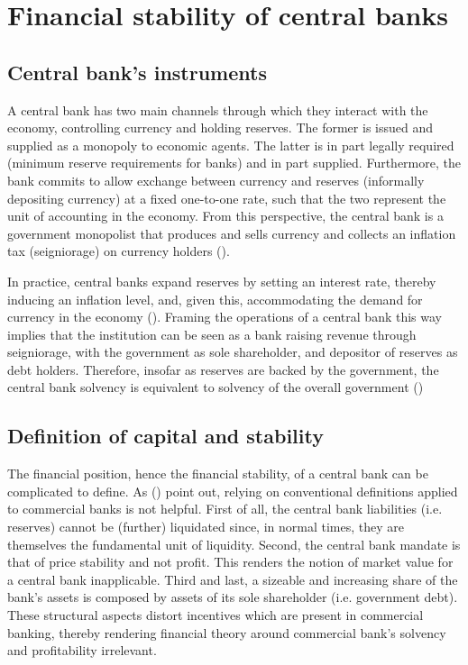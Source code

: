 \documentclass[american]{scrartcl}
\newcommand{\citein}[1]{\citeauthor{#1} (\citeyear{#1})}
\begin{document}
\section{Financial stability of central banks}

\subsection{Central bank's instruments}

A central bank has two main channels through which they interact with the economy, controlling currency and holding reserves. The former is issued and supplied as a monopoly to economic agents. The latter is in part legally required (minimum reserve requirements for banks) and in part supplied. Furthermore, the bank commits to allow exchange between currency and reserves (informally depositing currency) at a fixed one-to-one rate, such that the two represent the unit of accounting in the economy. From this perspective, the central bank is a government monopolist that produces and sells currency and collects an inflation tax (seigniorage) on currency holders (\cite[p.~15]{Reis2016}).

In practice, central banks expand reserves by setting an interest rate, thereby inducing an inflation level, and, given this, accommodating the demand for currency in the economy (\cite[p.~17]{Reis2016}). Framing the operations of a central bank this way implies that the institution can be seen as a bank raising revenue through seigniorage, with the government as sole shareholder, and depositor of reserves as debt holders. Therefore, insofar as reserves are backed by the government, the central bank solvency is equivalent to solvency of the overall government (\cite{Sims2001})


\subsection{Definition of capital and stability}

The financial position, hence the financial stability, of a central bank can be complicated to define. As \citein{Hall2015} point out, relying on conventional definitions applied to commercial banks is not helpful. First of all, the central bank liabilities (i.e. reserves) cannot be (further) liquidated since, in normal times, they are themselves the fundamental unit of liquidity. Second, the central bank mandate is that of price stability and not profit. This renders the notion of market value for a central bank inapplicable. Third and last, a sizeable and increasing share of the bank's assets is composed by assets of its sole shareholder (i.e. government debt). These structural aspects distort incentives which are present in commercial banking, thereby rendering financial theory around commercial bank's solvency and profitability irrelevant.
\end{document}
